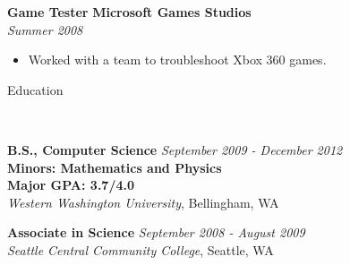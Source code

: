 \documentclass[9pt]{article}
\newenvironment{changemargin}[2]{%
  \begin{list}{}{%
    \setlength{\topsep}{0pt}%
    \setlength{\leftmargin}{#1}%
    \setlength{\rightmargin}{#2}%
    \setlength{\listparindent}{\parindent}%
    \setlength{\itemindent}{\parindent}%
    \setlength{\parsep}{\parskip}%
  }%
  \item[]}{\end{list}
}
\newcommand{\lineover}{
    \begin{changemargin}{-0.05in}{-0.05in}
        \vspace*{-8pt}
        \hrulefill \\
        \vspace*{-2pt}
    \end{changemargin}
}
\newcommand{\header}[1]{
    \begin{changemargin}{-0.5in}{-0.5in}
        {\large #1}\\
        \lineover
    \end{changemargin}
}
\newenvironment{body} {
    \vspace*{-16pt}
    \begin{changemargin}{-0.20in}{-0.5in}
  }
    {\end{changemargin}
}
\begin{document}
\begin{body}
    \textbf {Game Tester}
    \hfill
    \textbf{Microsoft Games Studios}\\
    \hfill
    \emph{Summer 2008}\\

    \vspace*{-14pt}
    \begin{itemize} %
        \item Worked with a team to troubleshoot Xbox 360 games.
    \end{itemize}

\end{body}

\smallskip


\header{Education}

\begin{body}
    \vspace{14pt}

    \textbf{B.S., Computer Science}{} \hfill \emph{September 2009 - December 2012}{} \\
    \textbf{Minors: Mathematics and Physics}\\
    \textbf{Major GPA: 3.7/4.0}\\
    \emph{Western Washington University}, Bellingham, WA{} \\
    \medskip

    \textbf{Associate in Science}{} \hfill \emph{September 2008 - August 2009} \\
    \emph{Seattle Central Community College}, Seattle, WA{} \\

\end{body}

\smallskip

\end{document}
